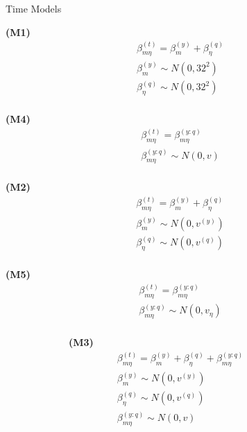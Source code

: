 \documentclass[ xcolor = pdftex, dvipsnames, table ]{beamer}
\begin{document}
%
\begin{frame}{Time Models}
\hspace*{-0.5cm}
\begin{minipage}{0.3\textwidth}
\begin{center}
\textbf{(M1)}
\begin{eqnarray*}
&\beta^{(t)}_{m\eta} = \beta^{(y)}_{m} + \beta^{(q)}_{\eta}&\\
&\beta^{(y)}_{m} \sim N(0, 32^2)&\\
&\beta^{(q)}_{\eta} \sim N(0, 32^2)&\\
&~&
\end{eqnarray*}
\end{center}

\begin{center}
\textbf{(M4)}
\begin{eqnarray*}
&\beta^{(t)}_{m\eta} = \beta^{(y:q)}_{m\eta}&\\
&\beta^{(y:q)}_{m\eta} \sim N(0, v)&\\
&~&
\end{eqnarray*}
\end{center}
\end{minipage}
\begin{minipage}{0.3\textwidth}
\begin{center}
\textbf{(M2)}
\begin{eqnarray*}
&\beta^{(t)}_{m\eta} = \beta^{(y)}_{m} + \beta^{(q)}_{\eta}&\\
&\beta^{(y)}_{m} \sim N(0, v^{(y)})&\\
&\beta^{(q)}_{\eta} \sim N(0, v^{(q)})&\\
&~&
\end{eqnarray*}
\end{center}

\begin{center}
\textbf{(M5)}
\begin{eqnarray*}
&\beta^{(t)}_{m\eta} = \beta^{(y:q)}_{m\eta}&\\
&\beta^{(y:q)}_{m\eta} \sim N(0, v_\eta)&\\
&~&
\end{eqnarray*}
\end{center}
\end{minipage}
\begin{minipage}{0.3\textwidth}
\begin{center}
~~~~~~~~~~~~~\textbf{(M3)}
\begin{eqnarray*}
&\beta^{(t)}_{m\eta} = \beta^{(y)}_{m} + \beta^{(q)}_{\eta} + \beta^{(y:q)}_{m\eta} & \\
&\beta^{(y)}_{m} \sim N(0, v^{(y)}) & \\
&\beta^{(q)}_{\eta} \sim N(0, v^{(q)}) & \\
&\beta^{(y:q)}_{m\eta} \sim N(0, v) &
\end{eqnarray*}
\end{center}


\end{minipage}
\end{frame}
\end{document}
